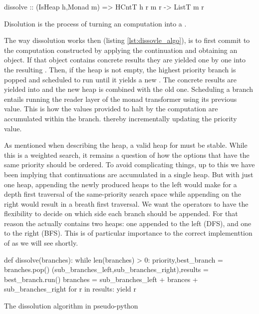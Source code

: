 \begin{code}
\begin{haskellcode}
dissolve :: (IsHeap h,Monad m) => HCntT h r m r -> ListT m r
\end{haskellcode}
  \caption{\label{lst:dissolve_func}Disolution is the process of
    turning an  computation into a .}
\end{code}

The way dissolution works then (listing \ref{lst:dissovle_algo}), is to first
commit to the computation constructed by applying the continuation and
obtaining an  object. If that object contains concrete results they are
yielded one by one into the resulting . 
Then, if the heap is not empty, the highest priority branch is popped and scheduled to run until it yields
a new . The concrete results are yielded into  and the
new heap is combined with the old one. Scheduling a branch entails
running the reader layer of the monad transformer using its previous
value. This is how the values provided to halt by the computation are accumulated within the branch.
thereby incrementally updating the priority value.

As mentioned when describing the heap, a valid heap for  must
be stable. While this is a weighted search, it remains a question of
how the options that have the same priority should be ordered. 
To avoid complicating things, up to this we have been implying that continuations are accumulated
in a single heap. But
with just one heap, appending the newly produced heaps to the left
would make for a depth first traversal of the same-priority search
space while appending on the right would result in a breath first
traversal. We want the operators to have the flexibility to decide on
which side each branch should be appended. For that reason the
 actually contains two heaps: one appended to the left
(DFS), and one to the right (BFS). This is of particular importance to
the correct implementtion of \hask{<//>} as we will see shortly.

\begin{code}
\begin{pycode}
def dissolve(branches):
    while len(branches) > 0:
        priority,best_branch = branches.pop()
        (sub_branches_left,sub_branches_right),results = best_branch.run()
        branches = sub_branches_left + brances + sub_branches_right
        for r in results:
            yield r
\end{pycode}
  \caption{\label{lst:dissovle_algo}The dissolution algorithm in
    pseudo-python}
\end{code}


